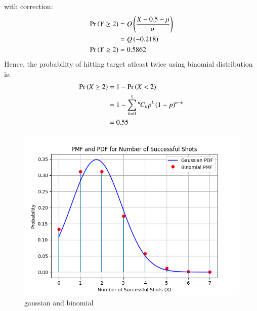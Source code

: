 \documentclass[journal,12pt,twocolumn]{IEEEtran}
\theoremstyle{remark}
\begin{document}
with correction:
\begin{align}
\Pr\left(Y \ge 2\right) &= Q\left(\frac{X-0.5-\mu}{\sigma}\right)\\
&= Q\left(-0.218\right)\\
\Pr\left(Y \ge 2\right) &= 0.5862
\end{align}
Hence, the probability of hitting target atleast twice using binomial distribution is:
\begin{align}
\Pr\left(X\ge 2\right) &= 1 - \Pr\left(X<2\right) \\
&= 1-\sum_{k=0}^{1}{{}^{n}\mkern-1muC_{k}}p^k\left(1-p\right)^{n-k} \\
&= 0.55
\end{align}
\begin{figure}
\includegraphics[width=\columnwidth]{figure/9.3.27.png}
\caption{gaussian and binomial}
\label{fig1:gaussian/9/3/27/}
\end{figure}
\end{document}
